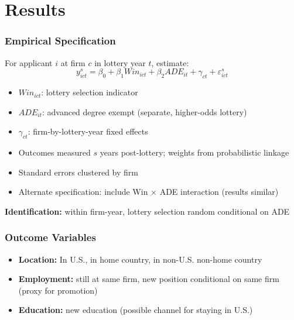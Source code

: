 \documentclass[xcolor=dvipsnames, compress, 12pt, aspectratio=169, presentation]{beamer}
\begin{document}
\section{Results}
\begin{frame}
    \frametitle{Empirical Specification}
    For applicant $i$ at firm $c$ in lottery year $t$, estimate:
    $$y_{ict}^s = \beta_0 + \beta_1 Win_{ict} + \beta_2 ADE_{it} + \gamma_{ct} + \varepsilon_{ict}^s$$
    \begin{itemize}
        \item $Win_{ict}$: lottery selection indicator
        \vspace{2mm}
        \item $ADE_{it}$: advanced degree exempt (separate, higher-odds lottery)
        \vspace{2mm}
        \item $\gamma_{ct}$: firm-by-lottery-year fixed effects
        \vspace{2mm}
        \item Outcomes measured $s$ years post-lottery; weights from probabilistic linkage
        \vspace{2mm}
        \item Standard errors clustered by firm
        \vspace{2mm}
        \item Alternate specification: include Win $\times$ ADE interaction (results similar)
    \end{itemize}
    \vspace{3mm}
    \textbf{Identification:} within firm-year, lottery selection random conditional on ADE 
\end{frame}

\begin{frame}
    \frametitle{Outcome Variables}
    \begin{itemize}
        \item \textbf{Location:} In U.S., in home country, in non-U.S. non-home country \vspace{4mm}
        \item \textbf{Employment:} still at same firm, new position conditional on same firm (proxy for promotion) \vspace{4mm}
        \item \textbf{Education:} new education (possible channel for staying in U.S.)
    \end{itemize}
\end{frame}
\end{document}
